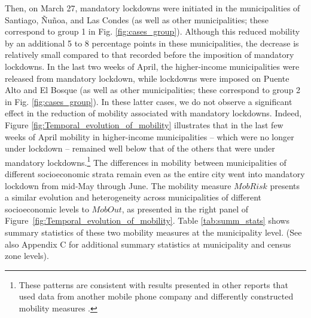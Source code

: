 Then, on March 27, mandatory lockdowns were initiated in the municipalities of Santiago, Ñuñoa, and Las Condes (as well as other municipalities; these correspond to group 1 in Fig. \ref{fig:cases_group}). Although this reduced mobility by an additional 5 to 8 percentage points in these municipalities, the decrease is relatively small compared to that recorded before the imposition of mandatory lockdowns.
In the last two weeks of April, the higher-income municipalities were released from mandatory lockdown, while  lockdowns were imposed on Puente Alto and El Bosque (as well as other municipalities; these correspond to group 2 in Fig. \ref{fig:cases_group}). In these latter cases, we do not observe a significant effect in the reduction of mobility associated with mandatory lockdowns. Indeed, Figure \ref{fig:Temporal_evolution_of_mobility} illustrates that in the last few weeks of April mobility in higher-income municipalities -- which were no longer under lockdown -- remained well below that of the others that were under mandatory lockdowns.\footnote{These patterns are consistent with results presented in other reports that used data from another mobile phone company and differently constructed mobility measures \citep{IndiceMovilidadUDD}.} 
The differences in mobility between municipalities of different socioeconomic strata remain even as the entire city went into mandatory lockdown from mid-May through June. The mobility measure $MobRisk$ presents a similar evolution and heterogeneity across municipalities of different socioeconomic levels to $MobOut$, as presented in the right panel of Figure~\ref{fig:Temporal_evolution_of_mobility}. Table \ref{tab:summ_stats} shows summary statistics of these two mobility measures at the municipality level. (See also Appendix C for additional summary statistics at municipality and census zone levels).


